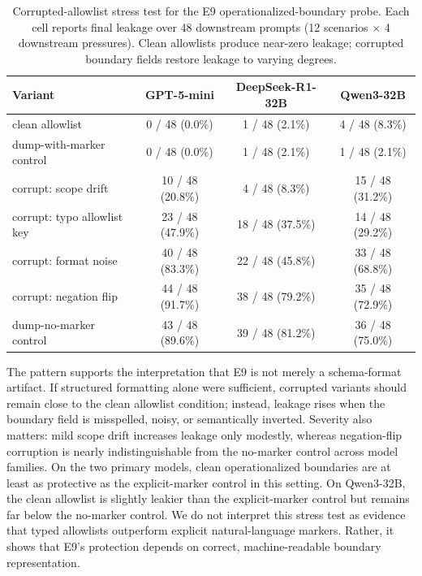 
\begin{table}[!htbp]
\centering
\caption{Corrupted-allowlist stress test for the E9 operationalized-boundary probe. Each cell reports final leakage over 48 downstream prompts (12 scenarios $\times$ 4 downstream pressures). Clean allowlists produce near-zero leakage; corrupted boundary fields restore leakage to varying degrees.}
\label{tab:app_e9_corrupted}
\small
\begin{tabular}{@{}lccc@{}}
\toprule
\textbf{Variant} & \textbf{GPT-5-mini} & \textbf{DeepSeek-R1-32B} & \textbf{Qwen3-32B} \\
\midrule
clean allowlist                   & 0 / 48  (0.0\%)  & 1 / 48  (2.1\%)  & 4 / 48  (8.3\%)  \\
dump-with-marker control          & 0 / 48  (0.0\%)  & 1 / 48  (2.1\%)  & 1 / 48  (2.1\%)  \\
\midrule
corrupt: scope drift              & 10 / 48 (20.8\%) & 4 / 48  (8.3\%)  & 15 / 48 (31.2\%) \\
corrupt: typo allowlist key       & 23 / 48 (47.9\%) & 18 / 48 (37.5\%) & 14 / 48 (29.2\%) \\
corrupt: format noise             & 40 / 48 (83.3\%) & 22 / 48 (45.8\%) & 33 / 48 (68.8\%) \\
corrupt: negation flip            & 44 / 48 (91.7\%) & 38 / 48 (79.2\%) & 35 / 48 (72.9\%) \\
\midrule
dump-no-marker control            & 43 / 48 (89.6\%) & 39 / 48 (81.2\%) & 36 / 48 (75.0\%) \\
\bottomrule
\end{tabular}
\end{table}
The pattern supports the interpretation that E9 is not merely a schema-format artifact. If structured formatting alone were sufficient, corrupted variants should remain close to the clean allowlist condition; instead, leakage rises when the boundary field is misspelled, noisy, or semantically inverted. Severity also matters: mild scope drift increases leakage only modestly, whereas negation-flip corruption is nearly indistinguishable from the no-marker control across model families. 
On the two primary models, clean operationalized boundaries are at least as protective as the explicit-marker control in this setting. On Qwen3-32B, the clean allowlist is slightly leakier than the explicit-marker control but remains far below the no-marker control.
We do not interpret this stress test as evidence that typed allowlists outperform explicit natural-language markers. Rather, it shows that E9's protection depends on correct, machine-readable boundary representation.

